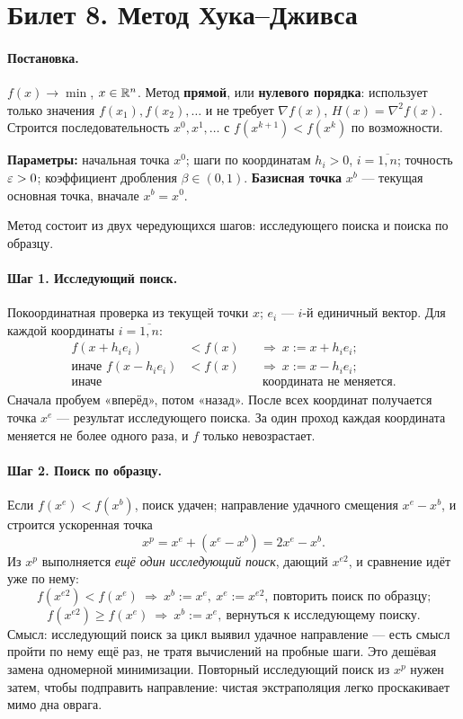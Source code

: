 \section{Билет 8. Метод Хука--Дживса}


\paragraph{Постановка.}
$f(x) \to \min$, $x \in \mathbb{R}^n$. Метод \textbf{прямой}, или \textbf{нулевого
порядка}: использует только значения $f(x_1), f(x_2), \dots$ и не требует
$\nabla f(x)$, $H(x) = \nabla^2 f(x)$. Строится последовательность
$x^0, x^1, \dots$ с $f(x^{k+1}) < f(x^k)$ по возможности.

\textbf{Параметры:} начальная точка $x^0$; шаги по координатам $h_i > 0$,
$i = \overline{1,n}$; точность $\varepsilon > 0$; коэффициент дробления
$\beta \in (0,1)$. \textbf{Базисная точка} $x^b$ — текущая основная точка,
вначале $x^b = x^0$.

Метод состоит из двух чередующихся шагов: исследующего поиска и поиска по
образцу.

\paragraph{Шаг 1. Исследующий поиск.}
Покоординатная проверка из текущей точки $x$; $e_i$ — $i$-й единичный вектор.
Для каждой координаты $i = \overline{1,n}$:
\[
  \begin{aligned}
    f(x + h_i e_i) &< f(x) &&\Rightarrow\ x := x + h_i e_i ; \\
    \text{иначе } f(x - h_i e_i) &< f(x) &&\Rightarrow\ x := x - h_i e_i ; \\
    \text{иначе} &&&\ \text{координата не меняется.}
  \end{aligned}
\]
Сначала пробуем «вперёд», потом «назад». После всех координат получается
точка $x^e$ — результат исследующего поиска. За один проход каждая координата
меняется не более одного раза, и $f$ только невозрастает.

\paragraph{Шаг 2. Поиск по образцу.}
Если $f(x^e) < f(x^b)$, поиск удачен; направление удачного смещения
$x^e - x^b$, и строится ускоренная точка
\[
  x^p = x^e + (x^e - x^b) = 2x^e - x^b .
\]
Из $x^p$ выполняется \emph{ещё один исследующий поиск}, дающий $x^{e2}$, и
сравнение идёт уже по нему:
\[
  f(x^{e2}) < f(x^e) \ \Rightarrow\ x^b := x^e,\ x^e := x^{e2},\
    \text{повторить поиск по образцу;}
\]
\[
  f(x^{e2}) \ge f(x^e) \ \Rightarrow\ x^b := x^e,\
    \text{вернуться к исследующему поиску.}
\]
Смысл: исследующий поиск за цикл выявил удачное направление — есть смысл
пройти по нему ещё раз, не тратя вычислений на пробные шаги. Это дешёвая
замена одномерной минимизации. Повторный исследующий поиск из $x^p$ нужен
затем, чтобы подправить направление: чистая экстраполяция легко проскакивает
мимо дна оврага.

